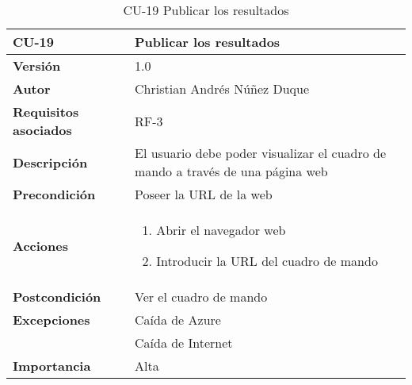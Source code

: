 \begin{table}[p]
	\centering
	\begin{tabularx}{\linewidth}{ p{} p{} }
		\toprule
		\textbf{CU-19}    & \textbf{Publicar los resultados}\\
		\toprule
		\textbf{Versión}              & 1.0    \\
		\textbf{Autor}                & Christian Andrés Núñez Duque \\
		\textbf{Requisitos asociados} & RF-3 \\
		\textbf{Descripción}          & El usuario debe poder visualizar el cuadro de mando a través de una página web \\
		\textbf{Precondición}         & Poseer la URL de la web \\
		\textbf{Acciones}             &
		\begin{enumerate}
			\def\labelenumi{\arabic{enumi}.}
			\tightlist
			\item Abrir el navegador web
			\item Introducir la URL del cuadro de mando
		\end{enumerate}\\
		\textbf{Postcondición}        & Ver el cuadro de mando \\
		\textbf{Excepciones}          & Caída de Azure \\ & Caída de Internet \\ 
		\textbf{Importancia}          & Alta \\
		\bottomrule
	\end{tabularx}
	\caption{CU-19 Publicar los resultados}
\end{table}